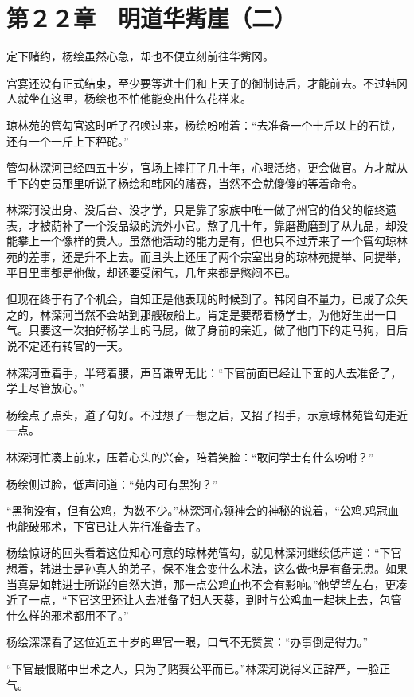 \section{第２２章　明道华觜崖（二）}

定下赌约，杨绘虽然心急，却也不便立刻前往华觜冈。

宫宴还没有正式结束，至少要等进士们和上天子的御制诗后，才能前去。不过韩冈人就坐在这里，杨绘也不怕他能变出什么花样来。

琼林苑的管勾官这时听了召唤过来，杨绘吩咐着：“去准备一个十斤以上的石锁，还有一个一斤上下秤砣。”

管勾林深河已经四五十岁，官场上摔打了几十年，心眼活络，更会做官。方才就从手下的吏员那里听说了杨绘和韩冈的赌赛，当然不会就傻傻的等着命令。

林深河没出身、没后台、没才学，只是靠了家族中唯一做了州官的伯父的临终遗表，才被荫补了一个没品级的流外小官。熬了几十年，靠磨勘磨到了从九品，却没能攀上一个像样的贵人。虽然他活动的能力是有，但也只不过弄来了一个管勾琼林苑的差事，还是升不上去。而且头上还压了两个宗室出身的琼林苑提举、同提举，平日里事都是他做，却还要受闲气，几年来都是憋闷不已。

但现在终于有了个机会，自知正是他表现的时候到了。韩冈自不量力，已成了众矢之的，林深河当然不会站到那艘破船上。肯定是要帮着杨学士，为他好生出一口气。只要这一次拍好杨学士的马屁，做了身前的亲近，做了他门下的走马狗，日后说不定还有转官的一天。

林深河垂着手，半弯着腰，声音谦卑无比：“下官前面已经让下面的人去准备了，学士尽管放心。”

杨绘点了点头，道了句好。不过想了一想之后，又招了招手，示意琼林苑管勾走近一点。

林深河忙凑上前来，压着心头的兴奋，陪着笑脸：“敢问学士有什么吩咐？”

杨绘侧过脸，低声问道：“苑内可有黑狗？”

“黑狗没有，但有公鸡，为数不少。”林深河心领神会的神秘的说着，“公鸡.鸡冠血也能破邪术，下官已让人先行准备去了。

杨绘惊讶的回头看着这位知心可意的琼林苑管勾，就见林深河继续低声道：“下官想着，韩进士是孙真人的弟子，保不准会变什么术法，这么做也是有备无患。如果当真是如韩进士所说的自然大道，那一点公鸡血也不会有影响。”他望望左右，更凑近了一点，“下官这里还让人去准备了妇人天葵，到时与公鸡血一起抹上去，包管什么样的邪术都用不了。”

杨绘深深看了这位近五十岁的卑官一眼，口气不无赞赏：“办事倒是得力。”

“下官最恨赌中出术之人，只为了赌赛公平而已。”林深河说得义正辞严，一脸正气。

